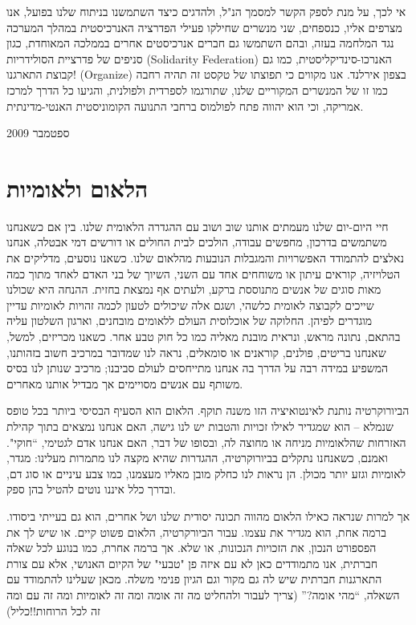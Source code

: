 אי לכך, על מנת לספק הקשר למסמך הנ"ל, ולהדגים כיצד השתמשנו בניתוח שלנו בפועל, אנו מצרפים אליו, כנספחים, שני מנשרים שחילקו פעילי הפדרציה האנרכיסטית במהלך המערכה נגד המלחמה בעזה, ובהם השתמשו גם חברים אנרכיסטים אחרים בממלכה המאוחדת, כגון סניפים של פדרציית הסולידריות (Solidarity Federation) האנרכו-סינדיקליסטית, כמו גם קבוצת התארגנו! (Organize) בצפון אירלנד. אנו מקווים כי תפוצתו של טקסט זה תהיה רחבה כמו זו של המנשרים המקוריים שלנו, שתורגמו לספרדית ולפולנית, והגיעו כל הדרך למרכז אמריקה, וכי הוא יהווה פתח לפולמוס ברחבי התנועה הקומוניסטית האנטי-מדינתית.

ספטמבר 2009

\section{הלאום ולאומיות}

חיי היום-יום שלנו מעמתים אותנו שוב ושוב עם ההגדרה הלאומית שלנו. בין אם כשאנחנו משתמשים בדרכון, מחפשים עבודה, הולכים לבית החולים או דורשים דמי אבטלה, אנחנו נאלצים להתמודד האפשרויות והמגבלות הנובעות מהלאום שלנו. כשאנו נוסעים, מדליקים את הטלויזיה, קוראים עיתון או משוחחים אחד עם השני, השיוך של בני האדם לאחד מתוך כמה מאות סוגים של אנשים מתנוססת ברקע, ולעתים אף נמצאת בחזית. ההנחה היא שכולנו שייכים לקבוצה לאומית כלשהי, ושגם אלה שיכולים לטעון לכמה זהויות לאומיות עדיין מוגדרים לפיהן. החלוקה של אוכלוסית העולם ללאומים מובחנים, וארגון השלטון עליה בהתאם, נתונה מראש, ונראית מובנת מאליה כמו כל חוק טבע אחר. כשאנו מכריזים, למשל, שאנחנו בריטים, פולנים, קוראנים או סומאלים, נראה לנו שמדובר במרכיב חשוב בזהותנו, המשפיע במידה רבה על הדרך בה אנחנו מתייחסים לעולם סביבנו; מרכיב שנותן לנו בסיס משותף עם אנשים מסויימים אך מבדיל אותנו מאחרים.

הביורוקרטיה נותנת לאינטואיציה הזו משנה תוקף. הלאום הוא הסעיף הבסיסי ביותר בכל טופס שנמלא – הוא שמגדיר לאילו זכויות והטבות יש לנו גישה, האם אנחנו נמצאים בתוך קהילת האזרחות שהלאומיות מניחה או מחוצה לה, ובסופו של דבר, האם אנחנו אדם לגטימי, “חוקי". ואמנם, כשאנחנו נתקלים בביורוקרטיה, ההגדרות שהיא מקצה לנו מתמרות מעלינו: מגדר, לאומיות וגזע יותר מכולן. הן נראות לנו כחלק מובן מאליו מעצמנו, כמו צבע עיניים או סוג דם, ובדרך כלל איננו נוטים להטיל בהן ספק.

אך למרות שנראה כאילו הלאום מהווה תכונה יסודית שלנו ושל אחרים, הוא גם בעייתי ביסודו. ברמה אחת, הוא מגדיר את עצמו. עבור הביורקרטיה, הלאום פשוט קיים. או שיש לך את הפספורט הנכון, את הזכויות הנכונות, או שלא. אך ברמה אחרת, כמו בנוגע לכל שאלה חברתית, אנו מתמודדים כאן לא עם איזה פן "טבעי" של הקיום האנושי, אלא עם צורת התארגנות חברתית שיש לה גם מקור וגם הגיון פנימי משלה. מכאן שעלינו להתמודד עם השאלה, “מהי אומה?” (צריך לעבור ולהחליט מה זה אומה ומה זה לאומיות ומה זה עם ומה זה לכל הרוחות!!כליל)

